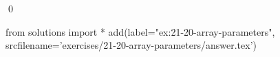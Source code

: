 
\begin{ex}
  \label{ex:21-20-array-parameters}
  
  \qed
\end{ex}
\begin{python0}
from solutions import *
add(label="ex:21-20-array-parameters",
    srcfilename='exercises/21-20-array-parameters/answer.tex')
\end{python0}
